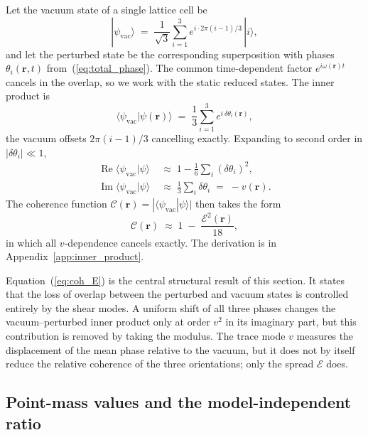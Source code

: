 \documentclass[pdflatex,sn-mathphys-num]{sn-jnl}%
\theoremstyle{thmstyleone}%
\theoremstyle{thmstyletwo}%
\theoremstyle{thmstylethree}%
\begin{document}
Let the vacuum state of a single lattice cell be
\begin{equation}
    |\psi_{\mathrm{vac}}\rangle
    \;=\;
    \frac{1}{\sqrt{3}}
    \sum_{i=1}^{3}e^{i\cdot 2\pi(i-1)/3}\,|i\rangle,
    \label{eq:vac_state}
\end{equation}
and let the perturbed state be the corresponding superposition
with phases $\theta_i(\mathbf{r},t)$ from~(\ref{eq:total_phase}).
The common time-dependent factor $e^{i\omega(\mathbf{r})t}$
cancels in the overlap, so we work with the static reduced
states. The inner product is
\begin{equation}
    \langle\psi_{\mathrm{vac}}|\psi(\mathbf{r})\rangle
    \;=\;
    \frac{1}{3}\sum_{i=1}^{3}e^{i\,\delta\theta_i(\mathbf{r})},
    \label{eq:inner_exact}
\end{equation}
the vacuum offsets $2\pi(i-1)/3$ cancelling exactly. Expanding
to second order in $|\delta\theta_i|\ll 1$,
\begin{align}
    \operatorname{Re}\langle\psi_{\mathrm{vac}}|\psi\rangle
    &\;\approx\;
    1-\frac{1}{6}\sum_i(\delta\theta_i)^2, \label{eq:Re_part}\\
    \operatorname{Im}\langle\psi_{\mathrm{vac}}|\psi\rangle
    &\;\approx\;
    \frac{1}{3}\sum_i\delta\theta_i
    \;=\;
    -v(\mathbf{r}).
    \label{eq:Im_part}
\end{align}
The coherence function
$\mathcal{C}(\mathbf{r})=|\langle\psi_{\mathrm{vac}}|\psi
\rangle|$ then takes the form
\begin{equation}
    \mathcal{C}(\mathbf{r})
    \;\approx\;
    1\;-\;\frac{\mathcal{E}^2(\mathbf{r})}{18},
    \label{eq:coh_E}
\end{equation}
in which all $v$-dependence cancels exactly. The derivation is
in Appendix~\ref{app:inner_product}.

Equation~(\ref{eq:coh_E}) is the central structural result of
this section. It states that the loss of overlap between
the perturbed and vacuum states is controlled entirely by the
shear modes. A uniform shift of all three phases changes the
vacuum--perturbed inner product only at order $v^2$ in its
imaginary part, but this contribution is removed by taking the
modulus. The trace mode $v$ measures the displacement of the
mean phase relative to the vacuum, but it does not by itself
reduce the relative coherence of the three orientations; only
the spread $\mathcal{E}$ does.

\subsection{Point-mass values and the model-independent ratio}
\end{document}
